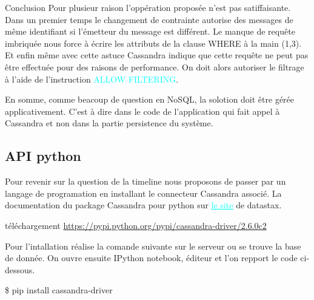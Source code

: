 \begin{block}{Conclusion}
Pour plusieur raison l'oppération proposée n'est pas satiffaisante.
Dans un premier temps le changement de contrainte autorise des messages de même identifiant si 
l'émetteur du message est différent. Le manque de requête imbriquée nous force à écrire 
les attributs de la clause WHERE à la main (1,3). Et enfin même avec cette astuce Cassandra indique que 
cette requête ne peut pas être effectuée pour des raisons de performance. On doit alors autoriser 
le filtrage à l'aide de l'instruction \textcolor{cyan}{ALLOW FILTERING}. \newline

En somme, comme beacoup de question en NoSQL, la solotion 
doit être gérée applicativement. C'est à dire dans le code de l'application qui fait appel à Cassandra 
et non dans la partie persistence du système.

\end{block}

\subsection{API python}
Pour revenir sur la question de la timeline nous proposons de passer par un langage de programation en installant
le connecteur Cassandra associé. La documentation du package Cassandra pour python sur \href{https://datastax.github.io/python-driver/}{\textcolor{cyan}{\underline{le site}}} de datastax.
\begin{block}{téléchargement} \href{https://pypi.python.org/pypi/cassandra-driver/}{https://pypi.python.org/pypi/cassandra-driver/2.6.0c2}\end{block}
Pour l'intallation réalise la comande suivante sur le serveur ou se trouve la base de donnée.
On ouvre ensuite IPython notebook, éditeur et l'on repport le code ci-dessous.
\begin{tt}\$ pip install cassandra-driver \end{tt}

